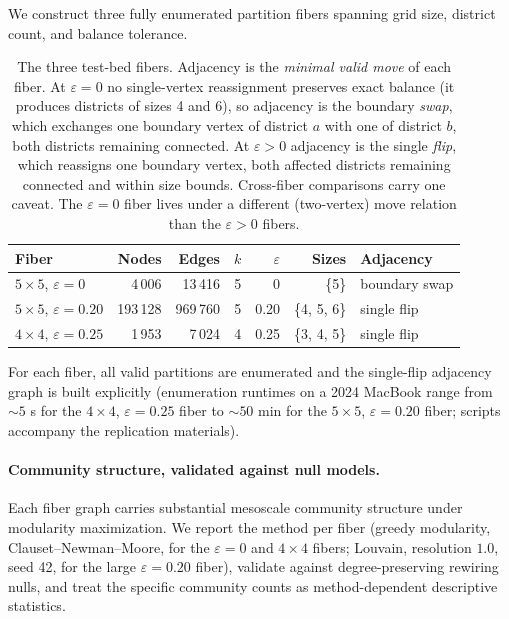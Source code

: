 \documentclass[11pt]{article}
\begin{document}
We construct three fully enumerated partition fibers spanning grid
size, district count, and balance tolerance.

\begin{table}[H]
\centering
\small
\begin{tabular}{lrrrrrl}
\toprule
Fiber & Nodes & Edges & $k$ & $\varepsilon$ & Sizes & Adjacency \\
\midrule
$5 \times 5$, $\varepsilon = 0$    & 4\,006   & 13\,416  & 5 & 0    & \{5\}       & boundary swap \\
$5 \times 5$, $\varepsilon = 0.20$ & 193\,128 & 969\,760 & 5 & 0.20 & \{4, 5, 6\} & single flip \\
$4 \times 4$, $\varepsilon = 0.25$ & 1\,953   & 7\,024   & 4 & 0.25 & \{3, 4, 5\} & single flip \\
\bottomrule
\end{tabular}
\caption{The three test-bed fibers. Adjacency is the \emph{minimal
  valid move} of each fiber. At $\varepsilon = 0$ no single-vertex
  reassignment preserves exact balance (it produces districts of sizes
  4 and 6), so adjacency is the boundary \emph{swap}, which exchanges one
  boundary vertex of district $a$ with one of district $b$, both
  districts remaining connected. At $\varepsilon > 0$ adjacency is the
  single \emph{flip}, which reassigns one boundary vertex, both affected
  districts remaining connected and within size bounds. Cross-fiber
  comparisons carry one caveat. The $\varepsilon = 0$
  fiber lives under a different (two-vertex) move relation than the
  $\varepsilon > 0$ fibers.}\label{tab:fibers}
\end{table}

For each fiber, all valid partitions are enumerated and the single-flip
adjacency graph is built explicitly (enumeration runtimes on a 2024
MacBook range from $\sim 5$ s for the $4 \times 4$,
$\varepsilon = 0.25$ fiber to $\sim 50$ min for the $5 \times 5$,
$\varepsilon = 0.20$ fiber; scripts accompany the replication
materials).

\paragraph{Community structure, validated against null models.}\label{sec:fiber-islands}

Each fiber graph carries substantial mesoscale community structure
under modularity maximization. We report the method per fiber (greedy
modularity, Clauset--Newman--Moore, for the $\varepsilon = 0$ and
$4 \times 4$ fibers; Louvain, resolution $1.0$, seed 42, for the large
$\varepsilon = 0.20$ fiber), validate against degree-preserving
rewiring nulls, and treat the specific community counts as
method-dependent descriptive statistics.
\end{document}
